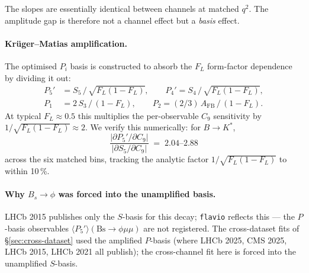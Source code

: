The slopes are essentially identical between channels at matched
$q^{2}$. The amplitude gap is therefore not a channel effect but a
\emph{basis} effect.

\paragraph{Krüger--Matias amplification.} The optimised $P_{i}$ basis
\citep{Kruger2005Pbasis,Descotes2013P5p} is constructed to absorb the
$F_{L}$ form-factor dependence by dividing it out:
\begin{align}
P_{5}' &= S_{5} \,/\, \sqrt{F_{L}(1-F_{L})}, \qquad
P_{4}' = S_{4} \,/\, \sqrt{F_{L}(1-F_{L})}, \\
P_{1}  &= 2\,S_{3} \,/\, (1-F_{L}), \qquad
P_{2}  = (2/3)\, A_{\mathrm{FB}} \,/\, (1-F_{L}).
\end{align}
At typical $F_{L}\approx 0.5$ this multiplies the per-observable
$C_{9}$ sensitivity by $1/\sqrt{F_{L}(1-F_{L})}\approx 2$. We verify
this numerically: for $B \to K^{*}$,
\begin{equation}
\frac{|\partial P_{5}'/\partial C_{9}|}{|\partial S_{5}/\partial C_{9}|}
\;=\; 2.04 \text{--} 2.88
\end{equation}
across the six matched bins, tracking the analytic factor
$1/\sqrt{F_{L}(1-F_{L})}$ to within 10\,\%.

\paragraph{Why $B_{s}\to\phi$ was forced into the unamplified basis.}
LHCb 2015 \citep{LHCb2015Bsphimumu} publishes only the $S$-basis for
this decay; \texttt{flavio} reflects this — the $P$-basis observables
$\langle P_{5}'\rangle(\text{Bs}\to\phi\mu\mu)$ are not registered.
The cross-dataset fits of \S\ref{sec:cross-dataset} used the amplified
$P$-basis (where LHCb 2025, CMS 2025, LHCb 2015, LHCb 2021 all
publish); the cross-channel fit here is forced into the unamplified
$S$-basis.

